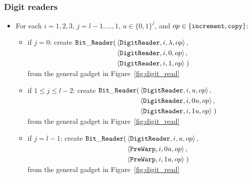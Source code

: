 \subsubsection{ Digit readers }

\begin{itemize}

\item For each $i = 1,2,3$,
               $j = l-1,\ldots,1$,
               $u \in \{0, 1\}^j$, and
               $op \in \{{\tt increment}, {\tt copy} \}$:
    \begin{itemize}
        \item if $j = 0$:
        create
        $\begin{aligned}[t]
            {\tt Bit\_Reader}(& \left\langle {\tt DigitReader}, i, \lambda, op \right\rangle, \\
                     & \left\langle {\tt DigitReader}, i, 0, op \right\rangle, \\
                     & \left\langle {\tt DigitReader}, i, 1, op \right\rangle \;)
        \end{aligned}$\\ from the general gadget in Figure~\ref{fig:digit_read}

        \item if $1 \leqslant j \leqslant l -2$:
        create
        $\begin{aligned}[t]
        {\tt Bit\_Reader}(& \left\langle {\tt DigitReader}, i, u,  op \right\rangle, \\
                 & \left\langle {\tt DigitReader}, i, 0u, op \right\rangle, \\
                 & \left\langle {\tt DigitReader}, i, 1u, op \right\rangle \;)
        \end{aligned}$\\ from the general gadget in Figure~\ref{fig:digit_read}

        \item if $j = l - 1$:
        create
        $\begin{aligned}[t]
            {\tt Bit\_Reader}(& \left\langle {\tt DigitReader}, i, u, op \right\rangle, \\
                     & \left\langle {\tt PreWarp}, i, 0u, op \right\rangle, \\
                     & \left\langle {\tt PreWarp}, i, 1u, op \right\rangle \;)
        \end{aligned}$\\from the general gadget in Figure~\ref{fig:digit_read}

    \end{itemize}


\end{itemize}

